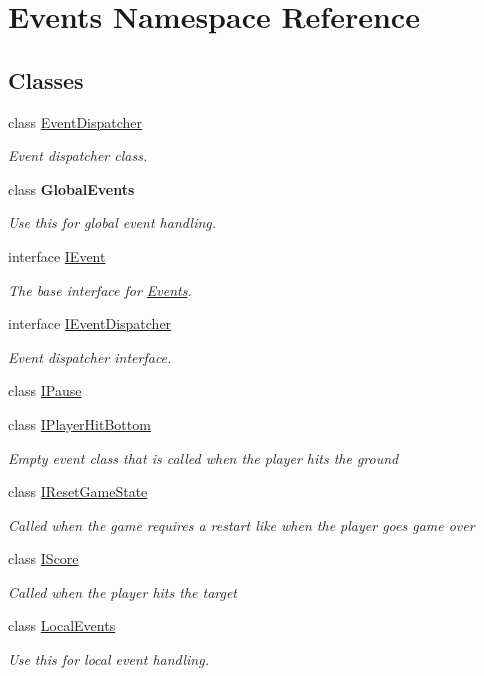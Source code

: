 \hypertarget{namespace_events}{}\section{Events Namespace Reference}
\label{namespace_events}
\subsection*{Classes}
\begin{DoxyCompactItemize}
\item 
class \hyperlink{class_events_1_1_event_dispatcher}{Event\+Dispatcher}
\begin{DoxyCompactList}\small\item\em Event dispatcher class. \end{DoxyCompactList}\item 
class {\bfseries Global\+Events}
\begin{DoxyCompactList}\small\item\em Use this for global event handling. \end{DoxyCompactList}\item 
interface \hyperlink{interface_events_1_1_i_event}{I\+Event}
\begin{DoxyCompactList}\small\item\em The base interface for \hyperlink{namespace_events}{Events}. \end{DoxyCompactList}\item 
interface \hyperlink{interface_events_1_1_i_event_dispatcher}{I\+Event\+Dispatcher}
\begin{DoxyCompactList}\small\item\em Event dispatcher interface. \end{DoxyCompactList}\item 
class \hyperlink{class_events_1_1_i_pause}{I\+Pause}
\item 
class \hyperlink{class_events_1_1_i_player_hit_bottom}{I\+Player\+Hit\+Bottom}
\begin{DoxyCompactList}\small\item\em Empty event class that is called when the player hits the ground \end{DoxyCompactList}\item 
class \hyperlink{class_events_1_1_i_reset_game_state}{I\+Reset\+Game\+State}
\begin{DoxyCompactList}\small\item\em Called when the game requires a restart like when the player goes game over \end{DoxyCompactList}\item 
class \hyperlink{class_events_1_1_i_score}{I\+Score}
\begin{DoxyCompactList}\small\item\em Called when the player hits the target \end{DoxyCompactList}\item 
class \hyperlink{class_events_1_1_local_events}{Local\+Events}
\begin{DoxyCompactList}\small\item\em Use this for local event handling. \end{DoxyCompactList}\end{DoxyCompactItemize}

